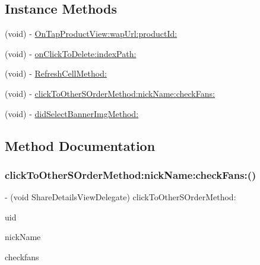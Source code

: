 \subsection*{Instance Methods}
\begin{DoxyCompactItemize}
\item 
(void) -\/ \mbox{\hyperlink{protocol_share_details_view_delegate_01-p_aee2087443ed792555a0b0e6e396d0a7e}{On\+Tap\+Product\+View\+:wap\+Url\+:product\+Id\+:}}
\item 
(void) -\/ \mbox{\hyperlink{protocol_share_details_view_delegate_01-p_a8454455fec78c412e65f2e7fa9d2db22}{on\+Click\+To\+Delete\+:index\+Path\+:}}
\item 
(void) -\/ \mbox{\hyperlink{protocol_share_details_view_delegate_01-p_ab394a1ad2942db4c92b991eaf7c994f3}{Refresh\+Cell\+Method\+:}}
\item 
(void) -\/ \mbox{\hyperlink{protocol_share_details_view_delegate_01-p_a730609eb727121448b013d8c59265e21}{click\+To\+Other\+S\+Order\+Method\+:nick\+Name\+:check\+Fans\+:}}
\item 
(void) -\/ \mbox{\hyperlink{protocol_share_details_view_delegate_01-p_a82fa8519fd3a819f5f10e0874e1c1234}{did\+Select\+Banner\+Img\+Method\+:}}
\end{DoxyCompactItemize}


\subsection{Method Documentation}
\mbox{\label{protocol_share_details_view_delegate_01-p_a730609eb727121448b013d8c59265e21}} 
\subsubsection{\texorpdfstring{click\+To\+Other\+S\+Order\+Method\+:nick\+Name\+:check\+Fans\+:()}{clickToOtherSOrderMethod:nickName:checkFans:()}}
{\footnotesize\ttfamily -\/ (void Share\+Details\+View\+Delegate) click\+To\+Other\+S\+Order\+Method\+: \begin{DoxyParamCaption}\item[{(N\+S\+String $\ast$)}]{uid }\item[{nickName:(N\+S\+String $\ast$)}]{nick\+Name }\item[{checkFans:(N\+S\+Integer)}]{checkfans }\end{DoxyParamCaption}\hspace{0.3cm}{\ttfamily [optional]}}

